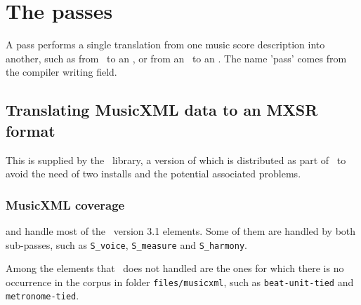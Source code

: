 



\chapter{The passes}

A pass performs a single translation from one music score description into another, such as from \mxml\ to an \mxsrRepr, or from an \mxsrRepr\ to an \msrRepr. The name 'pass' comes from the compiler writing field.


\section{Translating MusicXML data to an MXSR format}

This is supplied by the \libmusicxml\ library, a version of which is distributed as part of \mf\ to avoid the need of two installs and the potential associated problems.


\subsection{MusicXML coverage}\label{MusicXML coverage}

 and  handle most of the \mxml\ version 3.1 elements. Some of them are handled by both sub-passes, such as {\tt S_voice}, {\tt S_measure} and {\tt S_harmony}.

Among the elements that \mf\ does not handled are the ones for which there is no occurrence in the corpus in folder {\tt files/musicxml}, such as {\tt beat-unit-tied} and {\tt metronome-tied}.


